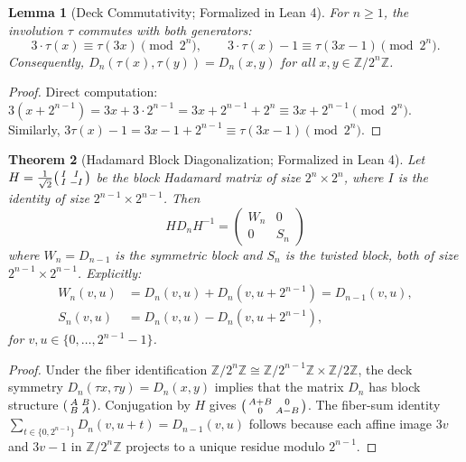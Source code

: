 \documentclass[11pt,reqno]{amsart}
\newtheorem{theorem}{Theorem}[section]
\newtheorem{lemma}[theorem]{Lemma}
\theoremstyle{definition}
\begin{document}
\begin{lemma}[Deck Commutativity; Formalized in Lean 4]\label{lem:tau-commute}
For $n \ge 1$, the involution $\tau$ commutes with both generators:
\[
3 \cdot \tau(x) \equiv \tau(3x) \pmod{2^n}, \qquad 3 \cdot \tau(x) - 1 \equiv \tau(3x - 1) \pmod{2^n}.
\]
Consequently, $D_n(\tau(x), \tau(y)) = D_n(x, y)$ for all $x, y \in \mathbb{Z}/2^n\mathbb{Z}$.
\end{lemma}

\begin{proof}
Direct computation: $3(x + 2^{n-1}) = 3x + 3 \cdot 2^{n-1} = 3x + 2^{n-1} + 2^n \equiv 3x + 2^{n-1} \pmod{2^n}$. Similarly, $3\tau(x) - 1 = 3x - 1 + 2^{n-1} \equiv \tau(3x - 1) \pmod{2^n}$.
\end{proof}

\begin{theorem}[Hadamard Block Diagonalization; Formalized in Lean 4]\label{thm:hadamard}
Let $H = \frac{1}{\sqrt{2}}\begin{psmallmatrix} I & I \\ I & -I \end{psmallmatrix}$ be the block Hadamard matrix of size $2^n \times 2^n$, where $I$ is the identity of size $2^{n-1} \times 2^{n-1}$. Then
\[
H D_n H^{-1} = \begin{pmatrix} W_n & 0 \\ 0 & S_n \end{pmatrix}
\]
where $W_n = D_{n-1}$ is the \emph{symmetric block} and $S_n$ is the \emph{twisted block}, both of size $2^{n-1} \times 2^{n-1}$. Explicitly:
\begin{align*}
W_n(v, u) &= D_n(v, u) + D_n(v, u + 2^{n-1}) = D_{n-1}(v, u), \\
S_n(v, u) &= D_n(v, u) - D_n(v, u + 2^{n-1}),
\end{align*}
for $v, u \in \{0, \ldots, 2^{n-1} - 1\}$.
\end{theorem}

\begin{proof}
Under the fiber identification $\mathbb{Z}/2^n\mathbb{Z} \cong \mathbb{Z}/2^{n-1}\mathbb{Z} \times \mathbb{Z}/2\mathbb{Z}$, the deck symmetry $D_n(\tau x, \tau y) = D_n(x, y)$ implies that the matrix $D_n$ has block structure $\begin{psmallmatrix} A & B \\ B & A \end{psmallmatrix}$. Conjugation by $H$ gives $\begin{psmallmatrix} A+B & 0 \\ 0 & A-B \end{psmallmatrix}$. The fiber-sum identity $\sum_{t \in \{0, 2^{n-1}\}} D_n(v, u + t) = D_{n-1}(v, u)$ follows because each affine image $3v$ and $3v-1$ in $\mathbb{Z}/2^n\mathbb{Z}$ projects to a unique residue modulo $2^{n-1}$.
\end{proof}
\end{document}

